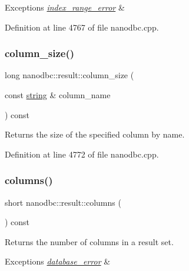 \begin{DoxyExceptions}{Exceptions}
{\em \mbox{\hyperlink{classnanodbc_1_1index__range__error}{index\+\_\+range\+\_\+error}}} & \\
\hline
\end{DoxyExceptions}


Definition at line 4767 of file nanodbc.\+cpp.

\mbox{\label{classnanodbc_1_1result_a43c42071bf86c4532039b61ad3f3c6c6}} 
\subsubsection{\texorpdfstring{column\_size()}{column\_size()}\hspace{0.1cm}{\footnotesize\ttfamily [2/2]}}
{\footnotesize\ttfamily long nanodbc\+::result\+::column\+\_\+size (\begin{DoxyParamCaption}\item[{const \mbox{\hyperlink{namespacenanodbc_abfc0ece56278e590911ec8352774c212}{string}} \&}]{column\+\_\+name }\end{DoxyParamCaption}) const}



Returns the size of the specified column by name. 



Definition at line 4772 of file nanodbc.\+cpp.

\mbox{\label{classnanodbc_1_1result_af21bbbe31f0e2578701edb3b386cd536}} 
\subsubsection{\texorpdfstring{columns()}{columns()}}
{\footnotesize\ttfamily short nanodbc\+::result\+::columns (\begin{DoxyParamCaption}{ }\end{DoxyParamCaption}) const}



Returns the number of columns in a result set. 


\begin{DoxyExceptions}{Exceptions}
{\em \mbox{\hyperlink{classnanodbc_1_1database__error}{database\+\_\+error}}} & \\
\hline
\end{DoxyExceptions}


